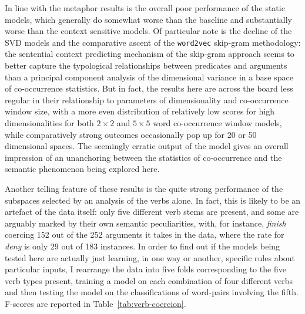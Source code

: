 In line with the metaphor results is the overall poor performance of the static models, which generally do somewhat worse than the baseline and substantially worse than the context sensitive models.  Of particular note is the decline of the \textsc{SVD} models and the comparative ascent of the \texttt{word2vec} skip-gram methodology: the sentential context predicting mechanism of the skip-gram approach seems to better capture the typological relationships between predicates and arguments than a principal component analysis of the dimensional variance in a base space of co-occurrence statistics.  But in fact, the results here are across the board less regular in their relationship to parameters of dimensionality and co-occurrence window size, with a more even distribution of relatively low scores for high dimensionalities for both $2 \times 2$ and $5 \times 5$ word co-occurrence window models, while comparatively strong outcomes occasionally pop up for 20 or 50 dimensional spaces.  The seemingly erratic output of the model gives an overall impression of an unanchoring between the statistics of co-occurrence and the semantic phenomenon being explored here.    

Another telling feature of these results is the quite strong performance of the subspaces selected by an analysis of the verbs alone.  In fact, this is likely to be an artefact of the data itself: only five different verb stems are present, and some are arguably marked by their own semantic peculiarities, with, for instance, \emph{finish} coercing 152 out of the 252 arguments it takes in the data, where the rate for \emph{deny} is only 29 out of 183 instances.  In order to find out if the models being tested here are actually just learning, in one way or another, specific rules about particular inputs, I rearrange the data into five folds corresponding to the five verb types present, training a model on each combination of four different verbs and then testing the model on the classifications of word-pairs involving the fifth.  F-scores are reported in Table~\ref{tab:verb-coercion}.

